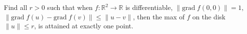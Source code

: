 Find all $ r > 0$ such that when $ f: \mathbb R^{2}\to \mathbb R$ is differentiable, $ \|\textrm{grad} \; f(0,0)\| = 1$, $ \|\textrm{grad} \; f(u) - \textrm{grad} \; f(v)\| \leq \| u - v\|$, then the max of $ f$ on the disk $ \|u\|\leq r$, is attained at exactly one point.